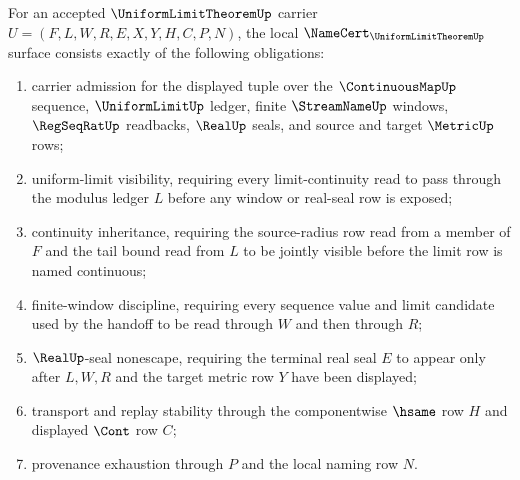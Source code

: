 \begin{theorem}
\label{thm:uniform-limit-theorem-namecert-obligations}
For an accepted $\UniformLimitTheoremUp$ carrier $U=(F,L,W,R,E,X,Y,H,C,P,N)$, the local $\NameCert_{\UniformLimitTheoremUp}$ surface consists exactly of the following obligations:
\begin{enumerate}
\item carrier admission for the displayed tuple over the $\ContinuousMapUp$ sequence, $\UniformLimitUp$ ledger, finite $\StreamNameUp$ windows, $\RegSeqRatUp$ readbacks, $\RealUp$ seals, and source and target $\MetricUp$ rows;
\item uniform-limit visibility, requiring every limit-continuity read to pass through the modulus ledger $L$ before any window or real-seal row is exposed;
\item continuity inheritance, requiring the source-radius row read from a member of $F$ and the tail bound read from $L$ to be jointly visible before the limit row is named continuous;
\item finite-window discipline, requiring every sequence value and limit candidate used by the handoff to be read through $W$ and then through $R$;
\item $\RealUp$-seal nonescape, requiring the terminal real seal $E$ to appear only after $L,W,R$ and the target metric row $Y$ have been displayed;
\item transport and replay stability through the componentwise $\hsame$ row $H$ and displayed $\Cont$ row $C$;
\item provenance exhaustion through $P$ and the local naming row $N$.
\end{enumerate}
\end{theorem}

